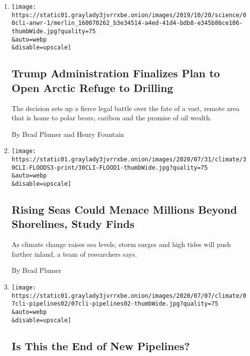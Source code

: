 \begin{enumerate}
\def\labelenumi{\arabic{enumi}.}
\item
  \href{/2020/08/17/climate/alaska-oil-drilling-anwr.html}{}

  \texttt{[image: https://static01.graylady3jvrrxbe.onion/images/2019/10/20/science/00cli-anwr-1/merlin\_160070262\_b3e34514-a4ed-41d4-bdb8-e345b86ce106-thumbWide.jpg?quality=75\\\&auto=webp\\\&disable=upscale]}

  \hypertarget{trump-administration-finalizes-plan-to-open-arctic-refuge-to-drilling}{%
  \subsection{Trump Administration Finalizes Plan to Open Arctic Refuge
  to
  Drilling}\label{trump-administration-finalizes-plan-to-open-arctic-refuge-to-drilling}}

  The decision sets up a fierce legal battle over the fate of a vast,
  remote area that is home to polar bears, caribou and the promise of
  oil wealth.

  By Brad Plumer and Henry Fountain
\item
  \href{/2020/07/30/climate/sea-level-inland-floods.html}{}

  \texttt{[image: https://static01.graylady3jvrrxbe.onion/images/2020/07/31/climate/30CLI-FLOODS3-print/30CLI-FLOOD1-thumbWide.jpg?quality=75\\\&auto=webp\\\&disable=upscale]}

  \hypertarget{rising-seas-could-menace-millions-beyond-shorelines-study-finds}{%
  \subsection{Rising Seas Could Menace Millions Beyond Shorelines, Study
  Finds}\label{rising-seas-could-menace-millions-beyond-shorelines-study-finds}}

  As climate change raises sea levels, storm surges and high tides will
  push farther inland, a team of researchers says.

  By Brad Plumer
\item
  \href{/2020/07/08/climate/dakota-access-keystone-atlantic-pipelines.html}{}

  \texttt{[image: https://static01.graylady3jvrrxbe.onion/images/2020/07/07/climate/07cli-pipelines02/07cli-pipelines02-thumbWide.jpg?quality=75\\\&auto=webp\\\&disable=upscale]}

  \hypertarget{is-this-the-end-of-new-pipelines}{%
  \subsection{Is This the End of New
  Pipelines?}\label{is-this-the-end-of-new-pipelines}}


\end{enumerate}
